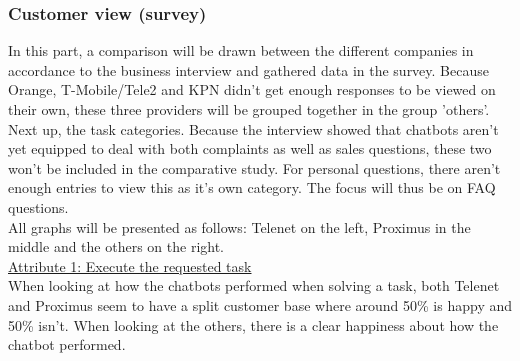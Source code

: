 \subsubsection{Customer view (survey)}
In this part, a comparison will be drawn between the different companies in accordance to the business interview and gathered data in the survey. Because Orange, T-Mobile/Tele2 and KPN didn't get enough responses to be viewed on their own, these three providers will be grouped together in the group 'others'.\\
\break
Next up, the task categories. Because the interview showed that chatbots aren't yet equipped to deal with both complaints as well as sales questions, these two won't be included in the comparative study. For personal questions, there aren't enough entries to view this as it's own category. The focus will thus be on FAQ questions.\\
\break
All graphs will be presented as follows: Telenet on the left, Proximus in the middle and the others on the right.\\
\break
\ul{Attribute 1: Execute the requested task}\\
\break
When looking at how the chatbots performed when solving a task, both Telenet and Proximus seem to have a split customer base where around 50\% is happy and 50\% isn't. When looking at the others, there is a clear happiness about how the chatbot performed.\\
